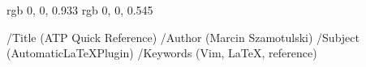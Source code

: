 %

\definecolor{blue2} 		{rgb} 	{0, 0, 0.933}
\definecolor{blue4} 		{rgb} 	{0, 0, 0.545}

\pdfpageheight=21cm  %
\pdfpagewidth=29.7cm
\pdfinfo %
{/Title (ATP Quick Reference)
 /Author (Marcin Szamotulski)
 /Subject (AutomaticLaTeXPlugin)
 /Keywords (Vim, LaTeX, reference)}
\def\bluelink#1#2{%
\leavevmode%
\textcolor{blue2}{\tenbf\begingroup\pdfstartlink%
attr{/BS<</Type/Border/S/S/W 1>>/C [1 1 1]}%
user{/Subtype/Link/A<</Type/Action/S/URI/URI(#1)>>}%
\ignorespaces#2%
\pdfendlink\endgroup}%
}

